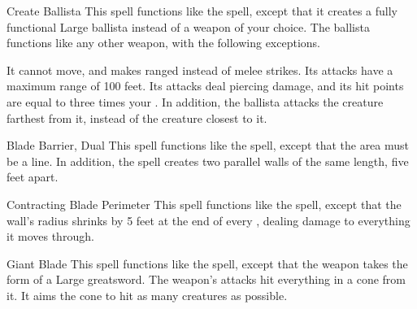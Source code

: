\lowercase{\hypertarget{spell:Create Ballista}{}}\label{spell:Create Ballista}
\begin{ability}[\nth{2}]{\hypertarget{spell:Create Ballista}{Create Ballista}}
This spell functions like the  spell, except that it creates a fully functional Large ballista instead of a weapon of your choice.
The ballista functions like any other weapon, with the following exceptions.

It cannot move, and makes ranged  instead of melee strikes.
Its attacks have a maximum range of 100 feet.
Its attacks deal piercing damage, and its hit points are equal to three times your .
In addition, the ballista attacks the creature farthest from it, instead of the creature closest to it.
\end{ability}
\vspace{0.25em}



\lowercase{\hypertarget{spell:Blade Barrier, Dual}{}}\label{spell:Blade Barrier, Dual}
\begin{ability}[\nth{3}]{\hypertarget{spell:Blade Barrier, Dual}{Blade Barrier, Dual}}
This spell functions like the  spell, except that the area must be a line.
In addition, the spell creates two parallel walls of the same length, five feet apart.
\end{ability}
\vspace{0.25em}



\lowercase{\hypertarget{spell:Contracting Blade Perimeter}{}}\label{spell:Contracting Blade Perimeter}
\begin{ability}[\nth{3}]{\hypertarget{spell:Contracting Blade Perimeter}{Contracting Blade Perimeter}}
This spell functions like the  spell, except that the wall's radius shrinks by 5 feet at the end of every , dealing damage to everything it moves through.
\end{ability}
\vspace{0.25em}



\lowercase{\hypertarget{spell:Giant Blade}{}}\label{spell:Giant Blade}
\begin{ability}[\nth{3}]{\hypertarget{spell:Giant Blade}{Giant Blade}}
This spell functions like the  spell, except that the weapon takes the form of a Large greatsword.
The weapon's attacks hit everything in a \areasmall cone from it.
It aims the cone to hit as many creatures as possible.
\end{ability}
\vspace{0.25em}



